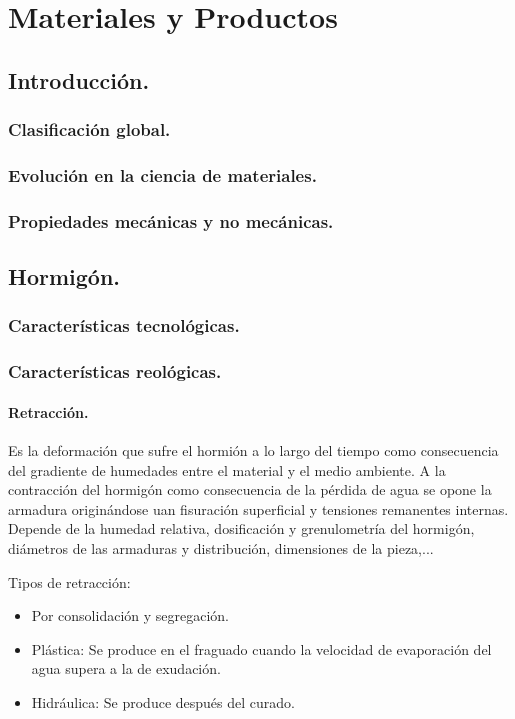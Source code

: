 \chapter{Materiales y Productos}
\section{Introducción.}
\subsection{Clasificación global.}
\subsection{Evolución en la ciencia de materiales.}
\subsection{Propiedades mecánicas y no mecánicas.}

\section{Hormigón.}
\subsection{Características tecnológicas.}
\subsection{Características reológicas.}

\subsubsection{Retracción.}
Es la deformación que sufre el hormión a lo largo del tiempo como consecuencia del gradiente de humedades entre el material y el medio ambiente. A la contracción del hormigón como consecuencia de la pérdida de agua se opone la armadura originándose uan fisuración superficial y tensiones remanentes internas. Depende de la humedad relativa, dosificación y grenulometría del hormigón, diámetros de las armaduras y distribución, dimensiones de la pieza,... 

Tipos de retracción:
\begin{itemize}
    \item Por consolidación y segregación.
    \item Plástica: Se produce en el fraguado cuando la velocidad de evaporación del agua supera a la de exudación.
    \item Hidráulica: Se produce después del curado.
\end{itemize}

